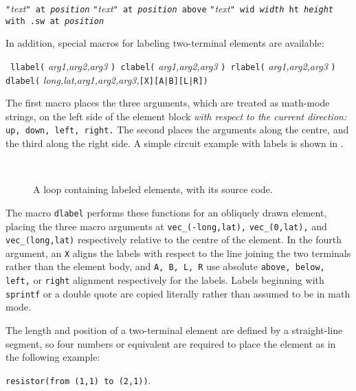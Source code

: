    {\tt "}{\sl text}{\tt" at {\sl position}}\NVL
   {\tt "}{\sl text}{\tt" at {\sl position} above}\NVL
   {\tt "}{\sl text}{\tt" wid {\sl width} ht {\sl height} 
     with .sw at {\sl position}}\NVL

   In addition, special macros for labeling two-terminal elements are available:
\par
{\tt
   llabel(} {\sl arg1,arg2,arg3} {\tt )
      \hfill\break\hspace*{\parindent}%
   clabel(} {\sl arg1,arg2,arg3} {\tt )
      \hfill\break\hspace*{\parindent}%
   rlabel(} {\sl arg1,arg2,arg3} {\tt )
      \hfill\break\hspace*{\parindent}%
   dlabel(} {\sl long,lat,arg1,arg2,arg3,}{\tt[X][A|B][L|R])}

The first macro places the three arguments, which are treated as math-mode
strings, on the left side of the element block {\em with respect to the
current direction:} {\tt up, down, left, right.}
The second places the arguments along the centre, and the third along the
right side.
A simple circuit example with labels is shown in .
\begin{figure}[h!t]
   \vspace*{-\baselineskip}
   \parbox{4in}{\small }%
   \hfill\raise-0.5in\hbox{ }
   \vspace*{-\baselineskip}
   \caption{A loop containing labeled elements, with its source code.}
   \label{Loop}
   \end{figure}
The macro {\tt dlabel} performs these functions for an
obliquely drawn element, placing the three macro arguments at
{\tt vec\_(-long,lat),} {\tt vec\_(0,lat),} and {\tt vec\_(long,lat)}
respectively relative to the centre of the element.
In the fourth argument, an {\tt X} aligns the labels with respect to the line
joining the two terminals rather than the element body, and
{\tt A, B, L, R} use absolute {\tt above, below, left,} or {\tt right} alignment
respectively for the labels.
Labels beginning
with {\tt sprintf} or a double quote are copied literally rather than
assumed to be in math mode.

The length and position of a two-terminal element
are defined by a straight-line segment, so
four numbers or equivalent
are required to place the element as in the following example:
\par
{\tt resistor(from (1,1) to (2,1))}.

